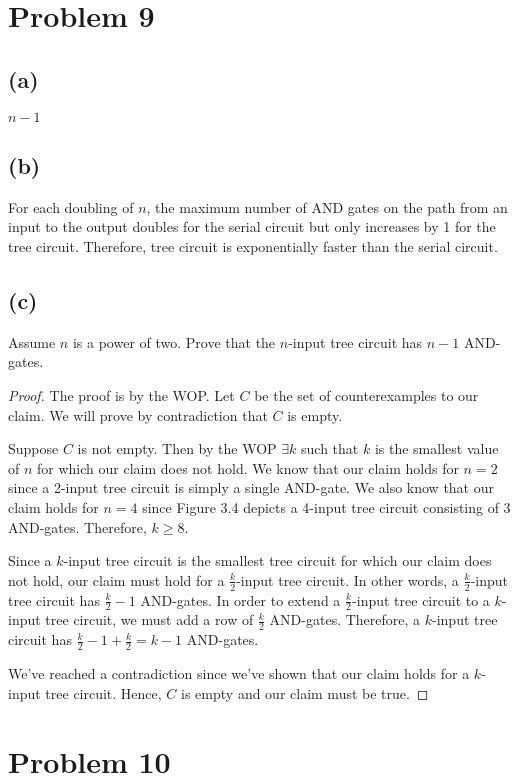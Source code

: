 \documentclass{article}
\begin{document}
\pagebreak

\section{Problem 9}
\subsection{(a)}
$n - 1$
\subsection{(b)}
For each doubling of $n$, the maximum number of AND gates on the path from an input to the output doubles for the serial circuit but only increases by 1 for the tree circuit. Therefore, tree circuit is exponentially faster than the serial circuit.
\subsection{(c)}
Assume $n$ is a power of two. Prove that the $n$-input tree circuit has $n - 1$ AND-gates.
\begin{proof}
	The proof is by the WOP. Let $C$ be the set of counterexamples to our claim. We will prove by contradiction that $C$ is empty.

	Suppose $C$ is not empty. Then by the WOP $\exists k$ such that $k$ is the smallest value of $n$ for which our claim does not hold. We know that our claim holds for $n = 2$ since a 2-input tree circuit is simply a single AND-gate. We also know that our claim holds for $n = 4$ since Figure 3.4 depicts a 4-input tree circuit consisting of 3 AND-gates. Therefore, $k \ge 8$.

	Since a $k$-input tree circuit is the smallest tree circuit for which our claim does not hold, our claim must hold for a $\frac{k}{2}$-input tree circuit. In other words, a $\frac{k}{2}$-input tree circuit has $\frac{k}{2} - 1$ AND-gates. In order to extend a $\frac{k}{2}$-input tree circuit to a $k$-input tree circuit, we must add a row of $\frac{k}{2}$ AND-gates. Therefore, a $k$-input tree circuit has $\frac{k}{2} - 1 + \frac{k}{2} = k - 1$ AND-gates.

	We've reached a contradiction since we've shown that our claim holds for a $k$-input tree circuit. Hence, $C$ is empty and our claim must be true.
\end{proof}


\pagebreak

\section{Problem 10}
\end{document}
